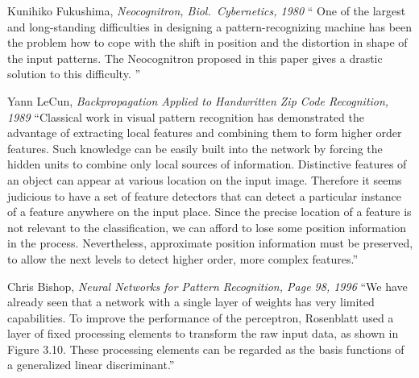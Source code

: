 \documentclass[thesis]{subfiles}
\begin{document}
    
	\begin{chapquote}{Kunihiko Fukushima, \textit{Neocognitron, 
				Biol.\ Cybernetics, 1980}}
		`` One of the largest and long-standing difficulties in designing a pattern-recognizing machine has been the problem how to cope with the shift in position and the distortion in shape of the input patterns. The Neocognitron proposed in this paper gives a drastic solution to this difficulty.
		''
	\end{chapquote}
	
	
	\begin{chapquote}{Yann LeCun, \textit{Backpropagation Applied to Handwritten Zip Code Recognition, 1989}}
		``Classical work in visual pattern recognition has demonstrated the advantage of extracting local features and combining them to form higher order features. Such knowledge can be easily built into the network by forcing the hidden units to combine only local sources of information. Distinctive features of an object can appear at various location on the input image. Therefore it seems judicious to have a set of feature detectors that can detect a particular instance of a feature anywhere on the input place. Since the precise location of a feature is not relevant to the classification, we can afford to lose some position information in the process. Nevertheless, approximate position information must be preserved, to allow the next levels to detect higher order, more complex features.''
	\end{chapquote}
	
	
	\begin{chapquote}{Chris Bishop, \textit{Neural Networks for Pattern Recognition, Page 98, 1996}}
	    ``We have already seen that a network with a single layer of weights has very
limited capabilities. To improve the performance of the perceptron, Rosenblatt
used a layer of fixed processing elements to transform the raw input data, as
shown in Figure 3.10. These processing elements can be regarded as the basis
functions of a generalized linear discriminant.''
	\end{chapquote}
\end{document}
